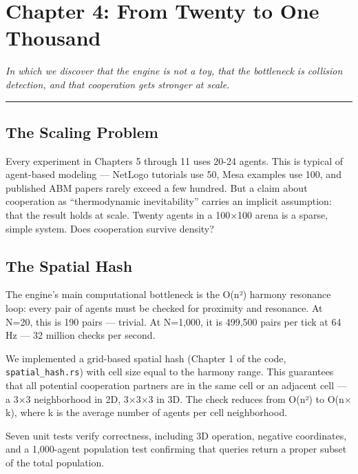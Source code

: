 \chapter{Chapter 4: From Twenty to One Thousand}\label{chapter-4-from-twenty-to-one-thousand}

\emph{In which we discover that the engine is not a toy, that the bottleneck is collision detection, and that cooperation gets stronger at scale.}

\begin{center}\rule{0.5\linewidth}{0.5pt}\end{center}

\section{The Scaling Problem}\label{the-scaling-problem}

Every experiment in Chapters 5 through 11 uses 20-24 agents. This is typical of agent-based modeling --- NetLogo tutorials use 50, Mesa examples use 100, and published ABM papers rarely exceed a few hundred. But a claim about cooperation as ``thermodynamic inevitability'' carries an implicit assumption: that the result holds at scale. Twenty agents in a 100$\times$100 arena is a sparse, simple system. Does cooperation survive density?

\section{The Spatial Hash}\label{the-spatial-hash}

The engine's main computational bottleneck is the O(n²) harmony resonance loop: every pair of agents must be checked for proximity and resonance. At N=20, this is 190 pairs --- trivial. At N=1,000, it is 499,500 pairs per tick at 64 Hz --- 32 million checks per second.

We implemented a grid-based spatial hash (Chapter 1 of the code, \texttt{spatial\_hash.rs}) with cell size equal to the harmony range. This guarantees that all potential cooperation partners are in the same cell or an adjacent cell --- a 3$\times$3 neighborhood in 2D, 3$\times$3$\times$3 in 3D. The check reduces from O(n²) to O(n$\times$k), where k is the average number of agents per cell neighborhood.

Seven unit tests verify correctness, including 3D operation, negative coordinates, and a 1,000-agent population test confirming that queries return a proper subset of the total population.


